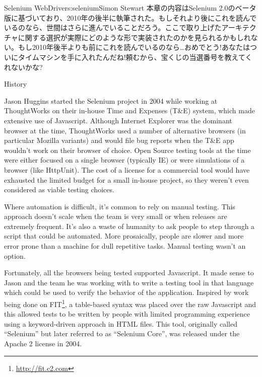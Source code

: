 \begin{aosachapter}{Selenium WebDriver}{s:selenium}{Simon Stewart}
本章の内容はSelenium 2.0のベータ版に基づいており、2010年の後半に執筆された。もしそれより後にこれを読んでいるのなら、世間はさらに進んでいることだろう。ここで取り上げたアーキテクチャに関する選択が実際にどのような形で実装されたのかを見られるかもしれない。もし2010年後半よりも前にこれを読んでいるのなら…おめでとう!あなたはついにタイムマシンを手に入れたんだね!頼むから、宝くじの当選番号を教えてくれないかな?

\begin{aosasect1}{History}

Jason Huggins started the Selenium project in 2004 while working at
ThoughtWorks on their in-house Time and Expenses (T\&E) system, which
made extensive use of Javascript. Although Internet Explorer was the
dominant browser at the time, ThoughtWorks used a number of
alternative browsers (in particular Mozilla variants) and would file
bug reports when the T\&E app wouldn't work on their browser of
choice. Open Source testing tools at the time were either focused on a
single browser (typically IE) or were simulations of a browser (like
HttpUnit).  The cost of a license for a commercial tool would have
exhausted the limited budget for a small in-house project, so they
weren't even considered as viable testing choices.

Where automation is difficult, it's common to rely on manual
testing. This approach doesn't scale when the team is very small or
when releases are extremely frequent. It's also a waste of humanity to
ask people to step through a script that could be automated. More
prosaically, people are slower and more error prone than a machine for
dull repetitive tasks.  Manual testing wasn't an option.

Fortunately, all the browsers being tested supported Javascript. It
made sense to Jason and the team he was working with to write a
testing tool in that language which could be used to verify the
behavior of the application. Inspired by work being done on
FIT\footnote{\url{http://fit.c2.com}}, a table-based syntax was placed
over the raw Javascript and this allowed tests to be written by people
with limited programming experience using a keyword-driven approach in
HTML files. This tool, originally called ``Selenium'' but later
referred to as ``Selenium Core'', was released under the Apache 2
license in 2004.


\end{aosasect1}
\end{aosachapter}
